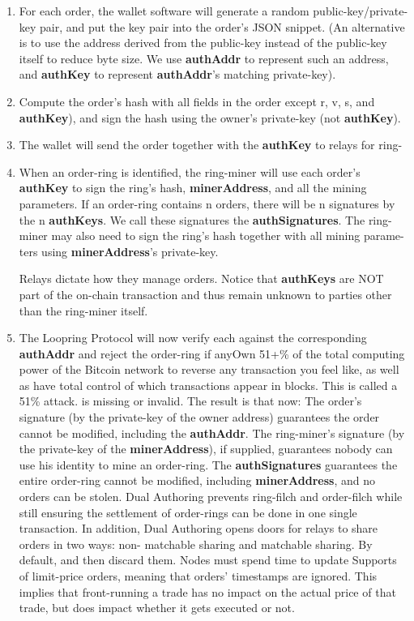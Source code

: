 \documentclass[]{article}
\begin{document}
		\begin{enumerate}
			\item For each order, the wallet software will generate a
			random public-key/private-key pair, and put the key
			pair into the order's JSON snippet. (An alternative is
			to use the address derived from the public-key instead
			of the public-key itself to reduce byte size. We use
			\textbf{authAddr} to represent such an address, and \textbf{authKey}
			to represent \textbf{authAddr}'s matching private-key).
			\item Compute the order's hash with all fields in the order
			except r, v, s, and \textbf{authKey}), and sign the hash using
			the owner's private-key (not \textbf{authKey}).
			\item The wallet will send the order together with the
			\textbf{authKey} to relays for ring-
			\item When an order-ring is identified, the ring-miner will
			use each order's \textbf{authKey} to sign the ring's hash,
			\textbf{minerAddress}, and all the mining parameters. If an
			order-ring contains n orders, there will be n signatures
			by the n \textbf{authKeys}. We call these signatures the
			\textbf{authSignatures}. The ring-miner may also need to
			sign the ring's hash together with all mining parame-
			ters using \textbf{minerAddress}'s private-key.
		
			Relays dictate how they manage orders.
			Notice that \textbf{authKeys} are NOT part
			of the on-chain transaction and thus remain unknown
			to parties other than the ring-miner itself.
			\item The Loopring Protocol will now verify each
			against the corresponding \textbf{authAddr}
			and reject the order-ring if anyOwn 51+\% of the total computing power of the Bitcoin network to reverse any transaction you feel like, as well as have total control of which transactions appear in blocks. This is called a 51\% attack.
			is missing or invalid.
			The result is that now:
			The order's signature (by the private-key of the owner
			address) guarantees the order cannot be modified,
			including the \textbf{authAddr}.
			The ring-miner's signature (by the private-key of the
			\textbf{minerAddress}), if supplied, guarantees nobody can
			use his identity to mine an order-ring.
			The \textbf{authSignatures} guarantees the entire order-ring
			cannot be modified, including \textbf{minerAddress}, and no
			orders can be stolen.
			Dual Authoring prevents ring-filch and order-filch while
			still ensuring the settlement of order-rings can be done
			in one single transaction. In addition, Dual Authoring
			opens doors for relays to share orders in two ways: non-
			matchable sharing and matchable sharing. By default,	
			and then discard them. Nodes must spend time to update
			Supports of limit-price orders, meaning that orders'
			timestamps are ignored.
			This implies that front-running a trade has no impact on
			the actual price of that trade, but does impact whether it
			gets executed or not.
			\end{enumerate}
		
\end{document}
